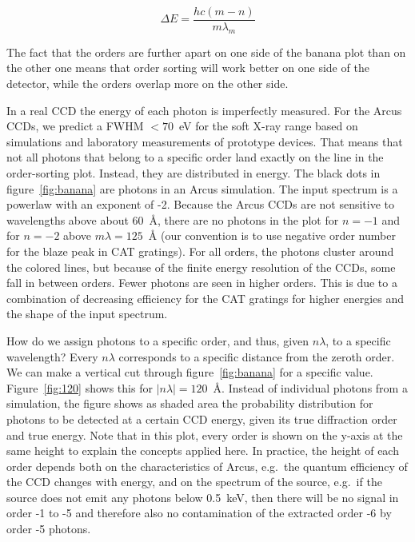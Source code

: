 \documentclass[12pt]{spieman}  %
\begin{document}
\begin{spacing}{2}
\begin{equation}
    \Delta E = \frac{hc (m-n)}{m\lambda_m} \label{eqn:deltae}
\end{equation}

The fact that the orders are further apart on one side of the banana plot than on the other one means that order sorting will work better on one side of the detector, while the orders overlap more on the other side.

In a real CCD the energy of each photon is imperfectly measured. For the Arcus CCDs, we predict a FWHM $<70$~eV for the soft X-ray range based on simulations and laboratory measurements of prototype devices\cite{Miller2023}. That means that not all photons that belong to a specific order land exactly on the line in the order-sorting plot. Instead, they are distributed in energy. The black dots in figure~\ref{fig:banana} are photons in an Arcus simulation. The input spectrum is a powerlaw with an exponent of -2. Because the Arcus CCDs are not sensitive to wavelengths above about 60~\AA{}, there are no photons in the plot for $n=-1$ and for $n=-2$ above $m\lambda=125$~\AA{} (our convention is to use negative order number for the blaze peak in CAT gratings). For all orders, the photons cluster around the colored lines, but because of the finite energy resolution of the CCDs, some fall in between orders. Fewer photons are seen in higher orders. This is due to a combination of decreasing efficiency for the CAT gratings for higher energies and the shape of the input spectrum.

How do we assign photons to a specific order, and thus, given $n\lambda$, to a specific wavelength? Every $n\lambda$ corresponds to a specific distance from the zeroth order. We can make a vertical cut through figure~\ref{fig:banana} for a specific value. Figure~\ref{fig:120} shows this for $|n\lambda|=120$~\AA{}. Instead of individual photons from a simulation, the figure shows as shaded area the probability distribution for photons to be detected at a certain CCD energy, given its true diffraction order and true energy. Note that in this plot, every order is shown on the y-axis at the same height to explain the concepts applied here. In practice, the height of each order depends both on the characteristics of Arcus, e.g.\ the quantum efficiency of the CCD changes with energy, and on the spectrum of the source, e.g.\ if the source does not emit any photons below 0.5~keV, then there will be no signal in order -1 to -5 and therefore also no contamination of the extracted order -6 by order -5 photons.


\end{spacing}
\end{document}
